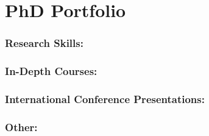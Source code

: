 %
%

\noquote
\orgchpos
\chapter*{PhD Portfolio}

\noindent

\subsection*{Research Skills:}
\vspace{1ex}

\subsection*{In-Depth Courses:}
\vspace{1ex}

\subsection*{International Conference Presentations:}
\vspace{1ex}

\subsection*{Other:}
\vspace{1ex}
